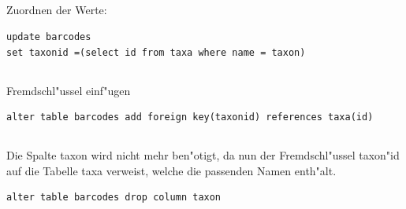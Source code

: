 \documentclass[a4paper, 11pt, titlepage]{article}
\begin{document}
\subsection{}
Zuordnen der Werte:
\begin{verbatim}
update barcodes
set taxonid =(select id from taxa where name = taxon)
\end{verbatim}
\subsection{}
Fremdschl"ussel einf"ugen
\begin{verbatim}
alter table barcodes add foreign key(taxonid) references taxa(id)
\end{verbatim}
\subsection{}
Die Spalte taxon wird nicht mehr ben"otigt, da nun der Fremdschl"ussel taxon"id auf die Tabelle taxa verweist, welche die passenden Namen enth"alt.
\begin{verbatim}
alter table barcodes drop column taxon
\end{verbatim}
\end{document}
